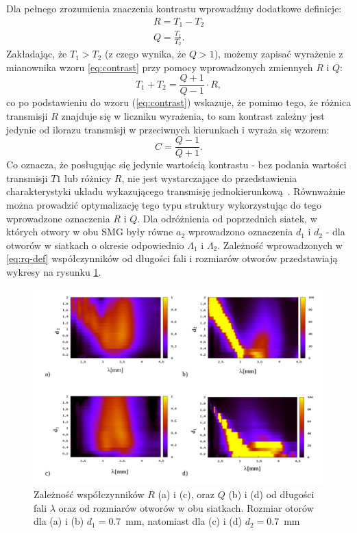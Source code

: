 Dla pełnego zrozumienia znaczenia kontrastu wprowadźmy dodatkowe definicje:
\begin{equation}
	\begin{gathered}
	R=T_1-T_2 \\
	Q=\frac{T_1}{T_2}.
	\end{gathered}
	\label{eq:rq-def}
\end{equation}
Zakładając, że $T_1>T_2$ (z czego wynika, że $Q>1$), możemy zapisać wyrażenie z mianownika wzoru \ref{eq:contrast} przy pomocy wprowadzonych zmiennych $R$ i $Q$:
\begin{equation}
	T_1+T_2=\frac{Q+1}{Q-1} \cdot R,
\end{equation}
co po podstawieniu do wzoru (\ref{eq:contrast}) wskazuje, że pomimo tego, że różnica transmisji $R$  znajduje się w liczniku wyrażenia, to sam kontrast zależny jest jedynie od ilorazu transmisji w przeciwnych kierunkach i wyraża się wzorem:
\begin{equation}
	C=\frac{Q-1}{Q+1}
	\label{eq:contrast-Q}.
\end{equation}
Co oznacza, że posługując się jedynie wartością kontrastu - bez podania wartości transmisji $T1$ lub różnicy $R$, nie jest wystarczające do przedstawienia charakterystyki układu wykazującego transmisję jednokierunkową~\cite{stolarek2013broadband}. Równważnie można prowadzić optymalizację tego typu struktury wykorzystując do tego wprowadzone oznaczenia $R$ i $Q$. Dla odróżnienia od poprzednich siatek, w których otwory w obu SMG były równe $a_2$ wprowadzono oznaczenia $d_1$ i $d_2$ - dla otworów w siatkach o okresie odpowiednio $\Lambda_1$ i $\Lambda_2$. Zależność wprowadzonych w \ref{eq:rq-def} współczynników od długości fali i rozmiarów otworów przedstawiają wykresy na rysunku \ref{fig:qr-od-d}.

\begin{figure}[tb]
	\includegraphics[width=\textwidth]{images/dmg/kontrast_maps.png}
	\caption{Zależność współczynników $R$ (a) i (c), oraz $Q$ (b) i (d) od długości fali $\lambda$ oraz od rozmiarów otworów w obu siatkach. Rozmiar otorów dla (a) i (b) $d_1=0.7$~mm, natomiast dla (c) i (d) $d_2=0.7$~mm }
	\label{fig:qr-od-d}
\end{figure}

